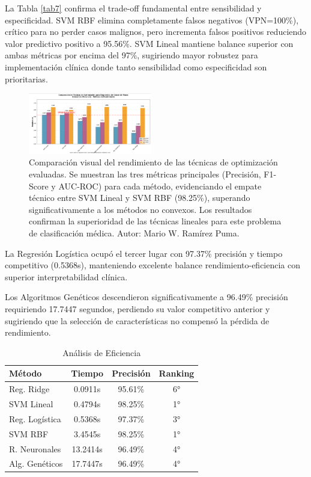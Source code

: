 \documentclass[conference]{IEEEtran}
\begin{document}
La Tabla \ref{tab7} confirma el trade-off fundamental entre sensibilidad y especificidad. SVM RBF elimina completamente falsos negativos (VPN=100\%), crítico para no perder casos malignos, pero incrementa falsos positivos reduciendo valor predictivo positivo a 95.56\%. SVM Lineal mantiene balance superior con ambas métricas por encima del 97\%, sugiriendo mayor robustez para implementación clínica donde tanto sensibilidad como especificidad son prioritarias.
\begin{figure}[htbp]
\centering
\includegraphics[width=0.48\textwidth]{CAP3.png}
\caption{Comparación visual del rendimiento de las técnicas de optimización evaluadas. Se muestran las tres métricas principales (Precisión, F1-Score y AUC-ROC) para cada método, evidenciando el empate técnico entre SVM Lineal y SVM RBF (98.25\%), superando significativamente a los métodos no convexos. Los resultados confirman la superioridad de las técnicas lineales para este problema de clasificación médica. Autor: Mario W. Ramírez Puma.}
\label{fig:comparacion_rendimiento}
\end{figure}

La Regresión Logística ocupó el tercer lugar con 97.37\% precisión y tiempo competitivo (0.5368s), manteniendo excelente balance rendimiento-eficiencia con superior interpretabilidad clínica.

Los Algoritmos Genéticos descendieron significativamente a 96.49\% precisión requiriendo 17.7447 segundos, perdiendo su valor competitivo anterior y sugiriendo que la selección de características no compensó la pérdida de rendimiento.

\begin{table}[htbp]
\caption{Análisis de Eficiencia}
\begin{center}
\footnotesize
\begin{tabular}{|l|c|c|c|}
\hline
\textbf{Método} & \textbf{Tiempo} & \textbf{Precisión} & \textbf{Ranking} \\
\hline
Reg. Ridge & 0.0911s & 95.61\% & 6° \\
\hline
SVM Lineal & 0.4794s & 98.25\% & 1° \\
\hline
Reg. Logística & 0.5368s & 97.37\% & 3° \\
\hline
SVM RBF & 3.4545s & 98.25\% & 1° \\
\hline
R. Neuronales & 13.2414s & 96.49\% & 4° \\
\hline
Alg. Genéticos & 17.7447s & 96.49\% & 4° \\
\hline
\end{tabular}
\label{tab3}
\end{center}
\end{table}
\end{document}
